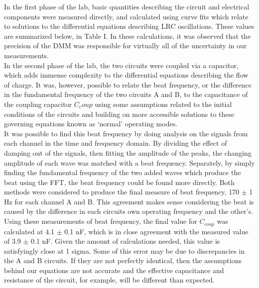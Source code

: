 \documentclass[aps,prl,reprint]{revtex4-2}
\begin{document}
In the first phase of the lab, basic quantities describing the circuit
and electrical components were measured directly, and calculated using
curve fits which relate to solutions to the differential equations describing
LRC oscillations. These values are summarized below, in Table I. In these
calculations, it was observed that the precision of the DMM was responsible
for virtually all of the uncertainty in our measurements. \\

In the second phase of the lab, the two circuits were coupled via a
capacitor, which adds immense complexity to the differential equations
describing the flow of charge. It was, however, possible to relate the
beat frequency, or the difference in the fundamental frequency of the
two circuits A and B, to the capacitance of the coupling capacitor $C_coup$
using some assumptions related to the initial conditions of the circuits
and building on more accessible solutions to these governing equations
known as `normal' operating modes. \\

It was possible to find this beat frequency by doing analysis on the
signals from each channel in the time and frequency domain. By
dividing the effect of damping out of the signals, then fitting
the amplitude of the peaks, the changing amplitude of each wave was matched
with a beat frequency. Separately, by simply finding the fundamental
frequency of the two added waves which produce the beat using the FFT,
the beat frequency could be found more directly. Both methods were 
considered to produce the final measure of beat frequency, 170 $\pm$ 1 Hz 
for each channel A and B. This agreement makes sense considering the
beat is caused by the difference in each circuits own operating frequency
and the other's. \\

Using these measurements of beat frequency, the final value for $C_{coup}$
was calculated at 4.1 $\pm$ 0.1 nF, which is in close agreement with the
measured value of 3.9 $\pm$ 0.1 nF. Given the amount of calculations needed,
this value is satisfyingly close at 1 sigma. Some of this error may
be due to discrepancies in the A and B circuits. If they are not perfectly
identical, then the assumptions behind our equations are not accurate and
the effective capacitance and resistance of the circuit, for example,
will be different than expected.
\end{document}

